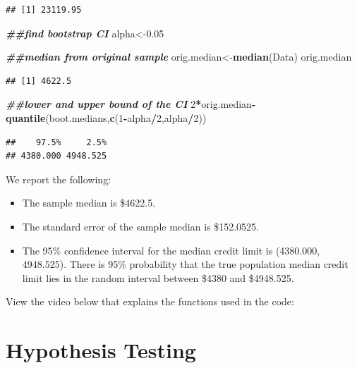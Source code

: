 \documentclass[
]{book}
\newenvironment{Shaded}{\begin{snugshade}}{\end{snugshade}}
\newcommand{\DecValTok}[1]{\textcolor[rgb]{0.00,0.00,0.81}{#1}}
\newcommand{\DocumentationTok}[1]{\textcolor[rgb]{0.56,0.35,0.01}{\textbf{\textit{#1}}}}
\newcommand{\FloatTok}[1]{\textcolor[rgb]{0.00,0.00,0.81}{#1}}
\newcommand{\FunctionTok}[1]{\textcolor[rgb]{0.13,0.29,0.53}{\textbf{#1}}}
\newcommand{\NormalTok}[1]{#1}
\newcommand{\OtherTok}[1]{\textcolor[rgb]{0.56,0.35,0.01}{#1}}
\newcommand{\SpecialCharTok}[1]{\textcolor[rgb]{0.81,0.36,0.00}{\textbf{#1}}}
\providecommand{\tightlist}{%
  \setlength{\itemsep}{0pt}\setlength{\parskip}{0pt}}
\begin{document}
\begin{verbatim}
## [1] 23119.95
\end{verbatim}

\begin{Shaded}
\begin{Highlighting}[]
\DocumentationTok{\#\#find bootstrap CI}
\NormalTok{alpha}\OtherTok{\textless{}{-}}\FloatTok{0.05}

\DocumentationTok{\#\#median from original sample}
\NormalTok{orig.median}\OtherTok{\textless{}{-}}\FunctionTok{median}\NormalTok{(Data)}
\NormalTok{orig.median}
\end{Highlighting}
\end{Shaded}

\begin{verbatim}
## [1] 4622.5
\end{verbatim}

\begin{Shaded}
\begin{Highlighting}[]
\DocumentationTok{\#\#lower and upper bound of the CI}
\DecValTok{2}\SpecialCharTok{*}\NormalTok{orig.median}\SpecialCharTok{{-}}\FunctionTok{quantile}\NormalTok{(boot.medians,}\FunctionTok{c}\NormalTok{(}\DecValTok{1}\SpecialCharTok{{-}}\NormalTok{alpha}\SpecialCharTok{/}\DecValTok{2}\NormalTok{,alpha}\SpecialCharTok{/}\DecValTok{2}\NormalTok{))}
\end{Highlighting}
\end{Shaded}

\begin{verbatim}
##    97.5%     2.5% 
## 4380.000 4948.525
\end{verbatim}

We report the following:

\begin{itemize}
\tightlist
\item
  The sample median is \$4622.5.
\item
  The standard error of the sample median is \$152.0525.
\item
  The 95\% confidence interval for the median credit limit is (4380.000, 4948.525). There is 95\% probability that the true population median credit limit lies in the random interval between \$4380 and \$4948.525.
\end{itemize}

View the video below that explains the functions used in the code:

\hypertarget{hypothesis-testing}{%
\chapter{Hypothesis Testing}\label{hypothesis-testing}}
\end{document}
